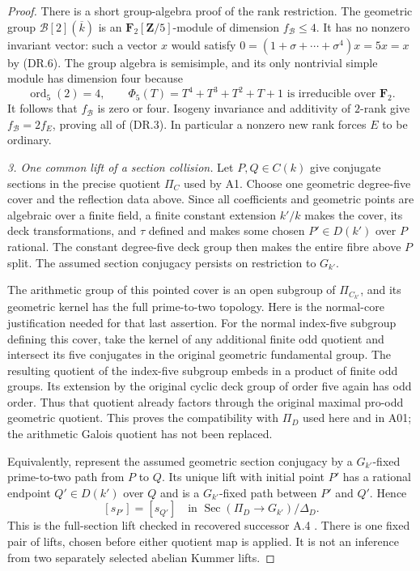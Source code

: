 \begin{proof}
There is a short group-algebra proof of the rank restriction.  The
geometric group $\mathcal B[2](\overline k)$ is an
$\mathbf F_2[\mathbf Z/5]$-module of dimension $f_{\mathcal B}\le4$.
It has no nonzero invariant vector: such a vector $x$ would satisfy
$0=(1+\sigma+\cdots+\sigma^4)x=5x=x$ by (DR.6).
The group algebra is semisimple, and its only nontrivial simple module
has dimension four because
\[
             \operatorname{ord}_5(2)=4,
             \qquad \Phi_5(T)=T^4+T^3+T^2+T+1
             \text{ is irreducible over }\mathbf F_2.
 \tag{DR.7}
\]
It follows that $f_{\mathcal B}$ is zero or four.  Isogeny invariance
and additivity of $2$-rank give $f_{\mathcal B}=2f_E$, proving all of
(DR.3).  In particular a nonzero new rank forces $E$ to be ordinary.

\emph{3. One common lift of a section collision.}
Let $P,Q\in C(k)$ give conjugate sections in the precise quotient
$\Pi_C$ used by A1.  Choose one geometric degree-five cover and the
reflection data above.  Since all coefficients and geometric points
are algebraic over a finite field, a finite constant extension $k'/k$
makes the cover, its deck transformations, and $\tau$ defined and makes
some chosen $P'\in D(k')$ over $P$ rational.  The constant degree-five
deck group then makes the entire fibre above $P$ split.  The assumed
section conjugacy persists on restriction to $G_{k'}$.

The arithmetic group of this pointed cover is an open subgroup of
$\Pi_{C_{k'}}$, and its geometric kernel has the full prime-to-two
topology.  Here is the normal-core justification needed for that
last assertion.  For the normal index-five subgroup defining this
cover, take the kernel of any additional finite odd quotient and
intersect its five conjugates in the original geometric fundamental
group.  The resulting quotient of the index-five subgroup embeds in
a product of finite odd groups.  Its extension by the original cyclic
deck group of order five again has odd order.  Thus that quotient
already factors through the original maximal pro-odd geometric
quotient.  This proves the compatibility with $\Pi_D$ used here and
in A01; the arithmetic Galois quotient has not been replaced.

Equivalently, represent the assumed geometric section conjugacy by a
$G_{k'}$-fixed prime-to-two path from $P$ to $Q$.  Its unique lift with
initial point $P'$ has a rational endpoint $Q'\in D(k')$ over $Q$ and
is a $G_{k'}$-fixed path between $P'$ and $Q'$.  Hence
\[
             [s_{P'}]=[s_{Q'}]
             \quad\text{in }\operatorname{Sec}(\Pi_D\to G_{k'})/\Delta_D.
 \tag{DR.8}
\]
This is the full-section lift checked in recovered successor A.4
\cite[A.4]{ASrun}.  There is one fixed pair of lifts, chosen before
either quotient map is applied.  It is not an inference from two
separately selected abelian Kummer lifts.


\end{proof}
